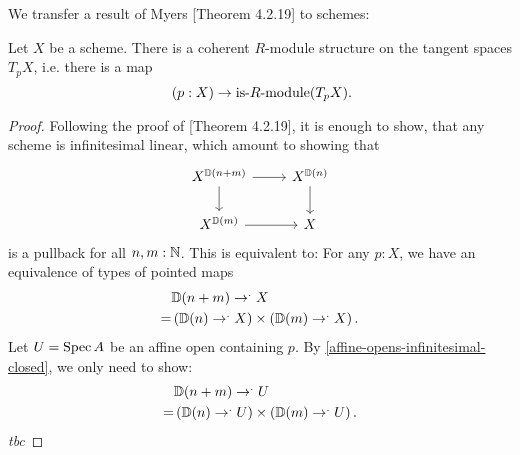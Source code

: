 We transfer a result of Myers \cite{david-orbifolds}[Theorem 4.2.19] to schemes:

\begin{theorem}%
  Let $X$ be a scheme.
  There is a coherent $R$-module structure on the tangent spaces $T_pX$,
  i.e. there is a map
  \[ (p:X)\to \text{is-$R$-module}(T_pX)\rlap{.}\]
\end{theorem}

\begin{proof}
  Following the proof of \cite{david-orbifolds}[Theorem 4.2.19],
  it is enough to show, that any scheme is infinitesimal linear,
  which amount to showing that
  \[
    \begin{tikzcd}
      X^{\D(n+m)}\ar[r]\ar[d] & X^{\D(n)}\ar[d] \\
      X^{\D(m)}\ar[r]         & X
    \end{tikzcd}
  \]
  is a pullback for all $n,m:\mathbb{N}$.
  This is equivalent to:
  For any $p:X$, we have an equivalence of types of pointed maps
  \begin{align*}
    &\mathbb{D}(n+m)\to^.X \\
    = &\left(\mathbb{D}(n)\to^.X\right) \times \left({\mathbb{D}(m)}\to^.X\right).
  \end{align*}
  Let $U=\operatorname{Spec} A$ be an affine open containing $p$.
  By \cref{affine-opens-infinitesimal-closed},
  we only need to show:
  \begin{align*}
    &\mathbb{D}(n+m)\to^.U \\
    = &\left(\mathbb{D}(n)\to^.U\right) \times \left({\mathbb{D}(m)}\to^.U\right).
  \end{align*}
  \emph{tbc}
\end{proof}
